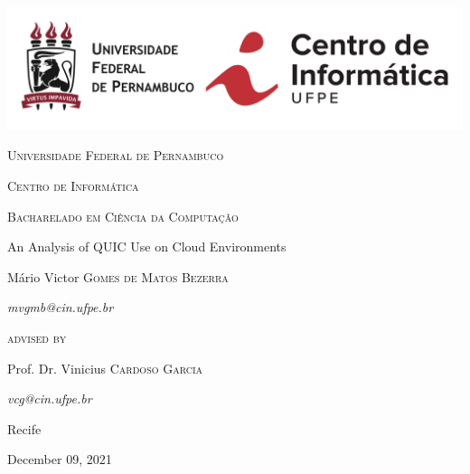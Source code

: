 \begin{titlepage}
	\centering
    \includegraphics[width=\linewidth]{figures/cin-ufpe.png}
	\vfill
    {\large\scshape Universidade Federal de Pernambuco\par}
    {\large\scshape Centro de Informática\par}
    {\large\scshape Bacharelado em Ciência da Computação\par}
	\vfill
	\vfill
	\vfill
	\vfill
	{\huge An Analysis of QUIC Use on Cloud Environments\par}
	\vfill
	{\large Mário Victor \textsc{Gomes de Matos Bezerra}\par}
	{\large\itshape mvgmb@cin.ufpe.br\par}
	\vfill
	\vfill
	\vfill
	\vfill
	{\scshape advised by\par}
	{\large Prof. Dr. Vinicius \textsc{Cardoso Garcia}\par}
	{\large\itshape vcg@cin.ufpe.br\par}
	\vfill
	\vfill
	{\large Recife\par}
	{\large December 09, 2021\par}
\end{titlepage}
